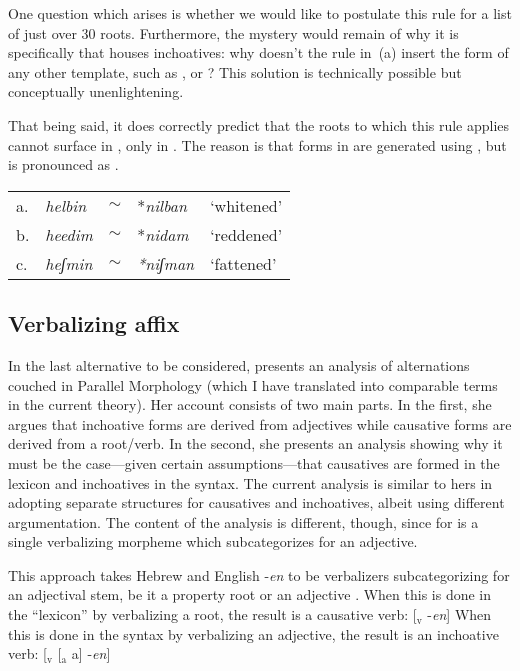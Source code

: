 One question which arises is whether we would like to postulate this rule for a list of just over 30 roots. Furthermore, the mystery would remain of why it is specifically {\thif} that houses inchoatives: why doesn't the rule in~(\lastx a) insert the form of any other template, such as {\tkal}, {\tnif} or {\tpie}? This solution is technically possible but conceptually unenlightening.

That being said, it does correctly predict that the roots to which this rule applies cannot surface in {\tnif}, only in {\thit}. The reason is that forms in {\tnif} are generated using {\vz}, but {\vz} is pronounced as {\thif}.
\ex\label{ex:vd:allo-pred}
\begin{tabular}{lllll}
	a. & \emph{helbin} & $\sim$ & *\emph{nilban} & `whitened' \\
	b. & \emph{heedim} & $\sim$ & *\emph{nidam} & `reddened'\\
	c. & \emph{heʃmin} & $\sim$ & \emph{*niʃman} & `fattened'\\
\end{tabular}
\xe

	\subsection{Verbalizing affix} \label{vd:others:borer}
In the last alternative to be considered, \cite{borer91} presents an analysis of {\thif} alternations couched in Parallel Morphology (which I have translated into comparable terms in the current theory). Her account consists of two main parts. In the first, she argues that inchoative forms are derived from adjectives while causative forms are derived from a root/verb. In the second, she presents an analysis showing why it must be the case---given certain assumptions---that causatives are formed in the lexicon and inchoatives in the syntax. The current analysis is similar to hers in adopting separate structures for causatives and inchoatives, albeit using different argumentation. The content of the analysis is different, though, since for \cite{borer91} {\thif} is a single verbalizing morpheme which subcategorizes for an adjective.

This approach takes Hebrew {\thif} and English -\emph{en} to be verbalizers subcategorizing for an adjectival stem, be it a property root or an adjective \citep[136]{borer91}. %
When this is done in the ``lexicon'' by verbalizing a root, the result is a causative verb:
\ex\label{ex:vd:thif-borer-caus}{[}$_{\text{v}}$  -\emph{en}]
\xe
When this is done in the syntax by verbalizing an adjective, the result is an inchoative verb:
\ex\label{ex:vd:thif-borer-inch}{[}$_{\text{v}}$ [$_{\text{a}}$  a] -\emph{en}]
\xe

